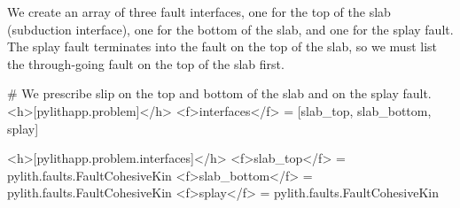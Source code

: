 We create an array of three fault interfaces, one for the top of the
slab (subduction interface), one for the bottom of the slab, and one
for the splay fault. The splay fault terminates into the fault on the
top of the slab, so we must list the through-going fault on the top of
the slab first.
\begin{cfg}
# We prescribe slip on the top and bottom of the slab and on the splay fault.
<h>[pylithapp.problem]</h>
<f>interfaces</f> = [slab_top, slab_bottom, splay]

<h>[pylithapp.problem.interfaces]</h>
<f>slab_top</f> = pylith.faults.FaultCohesiveKin
<f>slab_bottom</f> = pylith.faults.FaultCohesiveKin
<f>splay</f> = pylith.faults.FaultCohesiveKin
\end{cfg}


